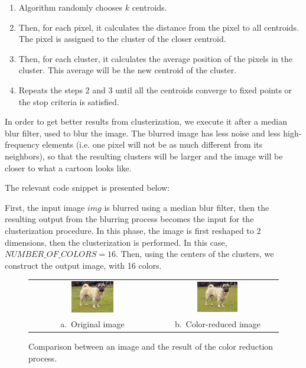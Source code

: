 \documentclass[]{IEEEtran}
\begin{document}
  \begin{enumerate}
      \item Algorithm randomly chooses $k$ centroids.
      \item Then, for each pixel, it calculates the distance from the pixel to
          all centroids. The pixel is assigned to the cluster of the closer
          centroid.
      \item Then, for each cluster, it calculates the average position of the pixels in
          the cluster. This average will be the new centroid of the cluster.
      \item Repeats the steps 2 and 3 until all the centroids converge to fixed
          points or the stop criteria is satisfied.
  \end{enumerate}

  In order to get better results from clusterization, we execute it after a
  median blur filter, used to blur the image. The blurred image has less noise
  and less high-frequency elements (i.e. one pixel will not be as much different
  from its neighbors), so that the resulting clusters will be larger and the
  image will be closer to what a cartoon looks like.

  The relevant code snippet is presented below:

  

  First, the input image $img$ is blurred using a median blur filter, then the
  resulting output from the blurring process becomes the input for the
  clusterization procedure. In this phase, the image is first reshaped to 2
  dimensions, then the clusterization is performed. In this case,
  $NUMBER\_OF\_COLORS = 16$. Then, using the centers of the clusters, we
  construct the output image, with 16 colors.

  \begin{figure}[t]
    \centering
    \begin{tabular}{c c}
    \includegraphics[width=0.35\textwidth]{./figures/3/dog.jpg} &
    \includegraphics[width=0.35\textwidth]{./figures/3/dog-3-1-2.jpg} \\
    a.~Original image & b.~Color-reduced image
    \end{tabular}
    \caption{Comparison between an image and the result of the color reduction
    process.}
    \label{figure:colorreduction}
  \end{figure}
\end{document}
